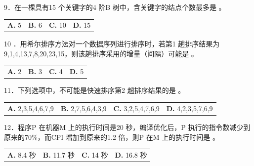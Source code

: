 \documentclass[UTF8,11pt]{ctexart}
\begin{document}
9．在一棵具有15 个关键字的4 阶B 树中，含关键字的结点个数最多是 。


\begin{center}\begin{tabular}{>{\raggedright\arraybackslash}p{\dimexpr(\linewidth-8\tabcolsep)/4\relax}>{\raggedright\arraybackslash}p{\dimexpr(\linewidth-8\tabcolsep)/4\relax}>{\raggedright\arraybackslash}p{\dimexpr(\linewidth-8\tabcolsep)/4\relax}>{\raggedright\arraybackslash}p{\dimexpr(\linewidth-8\tabcolsep)/4\relax}}
\textbf{A.} 5 & \textbf{B.} 6 & \textbf{C.} 10 & \textbf{D.} 15\\[.35em]\end{tabular}\end{center}

10 ．用希尔排序方法对一个数据序列进行排序时，若第1 趟排序结果为 9,1,4,13,7,8,20,23,15，则该趟排序采用的增量（间隔）可能是 。


\begin{center}\begin{tabular}{>{\raggedright\arraybackslash}p{\dimexpr(\linewidth-8\tabcolsep)/4\relax}>{\raggedright\arraybackslash}p{\dimexpr(\linewidth-8\tabcolsep)/4\relax}>{\raggedright\arraybackslash}p{\dimexpr(\linewidth-8\tabcolsep)/4\relax}>{\raggedright\arraybackslash}p{\dimexpr(\linewidth-8\tabcolsep)/4\relax}}
\textbf{A.} 2 & \textbf{B.} 3 & \textbf{C.} 4 & \textbf{D.} 5\\[.35em]\end{tabular}\end{center}

11．下列选项中，不可能是快速排序第2 趟排序结果的是 。


\begin{center}\begin{tabular}{>{\raggedright\arraybackslash}p{\dimexpr(\linewidth-8\tabcolsep)/4\relax}>{\raggedright\arraybackslash}p{\dimexpr(\linewidth-8\tabcolsep)/4\relax}>{\raggedright\arraybackslash}p{\dimexpr(\linewidth-8\tabcolsep)/4\relax}>{\raggedright\arraybackslash}p{\dimexpr(\linewidth-8\tabcolsep)/4\relax}}
\textbf{A.} 2,3,5,4,6,7,9 & \textbf{B.} 2,7,5,6,4,3,9 & \textbf{C.} 3,2,5,4,7,6,9 & \textbf{D.} 4,2,3,5,7,6,9\\[.35em]\end{tabular}\end{center}

12．程序P 在机器M 上的执行时间是20 秒，编译优化后，P 执行的指令数减少到原来的70\%，而CPI 增加到原来的1.2 倍，则P 在M 上的执行时间是 。


\begin{center}\begin{tabular}{>{\raggedright\arraybackslash}p{\dimexpr(\linewidth-8\tabcolsep)/4\relax}>{\raggedright\arraybackslash}p{\dimexpr(\linewidth-8\tabcolsep)/4\relax}>{\raggedright\arraybackslash}p{\dimexpr(\linewidth-8\tabcolsep)/4\relax}>{\raggedright\arraybackslash}p{\dimexpr(\linewidth-8\tabcolsep)/4\relax}}
\textbf{A.} 8.\allowbreak{}4 秒 & \textbf{B.} 11.\allowbreak{}7 秒 & \textbf{C.} 14 秒 & \textbf{D.} 16.\allowbreak{}8 秒\\[.35em]\end{tabular}\end{center}
\end{document}
